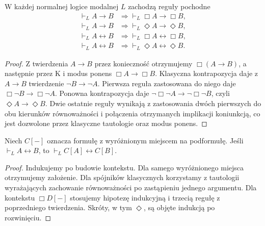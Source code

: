\begin{twierdzenie}
\label{thm:ncl-modal-monotonicity}
W każdej normalnej logice modalnej $L$ zachodzą
reguły pochodne
\[
\begin{aligned}
 \vdash_L A\to B&\Longrightarrow
                   \vdash_L\Box A\to\Box B,\\
 \vdash_L A\to B&\Longrightarrow
                   \vdash_L\Diamond A\to\Diamond B,\\
 \vdash_L A\leftrightarrow B&\Longrightarrow
                   \vdash_L\Box A\leftrightarrow\Box B,\\
 \vdash_L A\leftrightarrow B&\Longrightarrow
                   \vdash_L\Diamond A\leftrightarrow\Diamond B.
\end{aligned}
\]
\end{twierdzenie}
\begin{proof}
Z twierdzenia $A\to B$ przez konieczność otrzymujemy
$\Box(A\to B)$, a następnie przez K i modus ponens
$\Box A\to\Box B$.
Klasyczna kontrapozycja daje z $A\to B$
twierdzenie $\neg B\to\neg A$.
Pierwsza reguła zastosowana do niego daje
$\Box\neg B\to\Box\neg A$.
Ponowna kontrapozycja daje
$\neg\Box\neg A\to\neg\Box\neg B$, czyli
$\Diamond A\to\Diamond B$.
Dwie ostatnie reguły wynikają z zastosowania
dwóch pierwszych do obu kierunków równoważności
i połączenia otrzymanych implikacji koniunkcją,
co jest dozwolone przez klasyczne tautologie
oraz modus ponens.
\end{proof}

\begin{wniosek}
\label{cor:ncl-modal-context-replacement}
Niech $C[-]$ oznacza formułę z wyróżnionym miejscem
na podformułę. Jeśli $\vdash_L A\leftrightarrow B$,
to $\vdash_L C[A]\leftrightarrow C[B]$.
\end{wniosek}
\begin{proof}
Indukujemy po budowie kontekstu.
Dla samego wyróżnionego miejsca otrzymujemy
założenie. Dla spójników klasycznych korzystamy
z tautologii wyrażających zachowanie równoważności
po zastąpieniu jednego argumentu.
Dla kontekstu $\Box D[-]$ stosujemy hipotezę
indukcyjną i trzecią regułę z poprzedniego
twierdzenia. Skróty, w tym $\Diamond$, są objęte
indukcją po rozwinięciu.
\end{proof}

